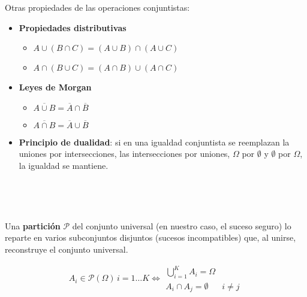\documentclass[11pt]{article}
\providecommand{\tightlist}{%
      \setlength{\itemsep}{0pt}\setlength{\parskip}{0pt}}
\begin{document}
    Otras propiedades de las operaciones conjuntistas:

\begin{itemize}
\tightlist
\item
  \textbf{Propiedades distributivas}
\begin{itemize}
\item
  \(A\cup(B\cap C) = (A\cup B)\cap(A\cup C)\)
\item
  \(A\cap(B\cup C) = (A\cap B)\cup(A\cap C)\)
\end{itemize}
\item
  \textbf{Leyes de Morgan}
\begin{itemize}
\item
  \(\overline{A\cup B} = \overline{A}\cap \overline{B}\)
\item
  \(\overline{A\cap B} = \overline{A}\cup \overline{B}\)
\end{itemize}
\item
  \textbf{Principio de dualidad}: si en una igualdad conjuntista se
  reemplazan la uniones por intersecciones, las intersecciones por
  uniones, \(\Omega\) por \(\emptyset\) y \(\emptyset\) por \(\Omega\),
  la igualdad se mantiene.
\end{itemize}

    \begin{center}
    \end{center}
    { \hspace*{\fill} \\}
    
    \begin{center}
    \end{center}
    { \hspace*{\fill} \\}
    
    Una \textbf{partición} \(\mathscr{P}\) del conjunto universal (en
nuestro caso, el suceso seguro) lo reparte en varios subconjuntos
disjuntos (sucesos incompatibles) que, al unirse, reconstruye el
conjunto universal.

\[A_i \in \mathscr{P}(\Omega) \, i=1\ldots K \iff  \begin{matrix}
  \bigcup_{i=1}^K A_i = \Omega &  \\
  A_i \cap A_j = \emptyset & i\neq j  
 \end{matrix}\]
\end{document}
